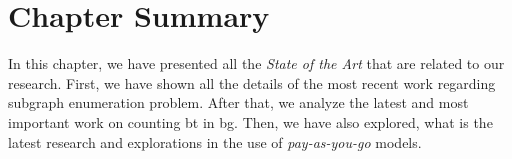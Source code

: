 \section{Chapter Summary}
In this chapter, we have presented all the \emph{State of the Art} that are related to our research.
First, we have shown all the details of the most recent work regarding subgraph enumeration problem. 
After that, we analyze the latest and most important work on counting \acrlong{bt} in \acrlong{bg}.
Then, we have also explored, what is the latest research and explorations in the use of \emph{pay-as-you-go} models.
